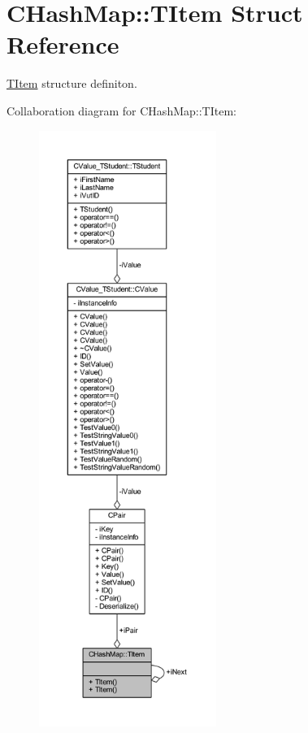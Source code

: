 \hypertarget{struct_c_hash_map_1_1_t_item}{}\section{C\+Hash\+Map\+:\+:T\+Item Struct Reference}
\label{struct_c_hash_map_1_1_t_item}


\hyperlink{struct_c_hash_map_1_1_t_item}{T\+Item} structure definiton.  




Collaboration diagram for C\+Hash\+Map\+:\+:T\+Item\+:\nopagebreak
\begin{figure}[H]
\begin{center}
\leavevmode
\includegraphics[height=550pt]{struct_c_hash_map_1_1_t_item__coll__graph}
\end{center}
\end{figure}
